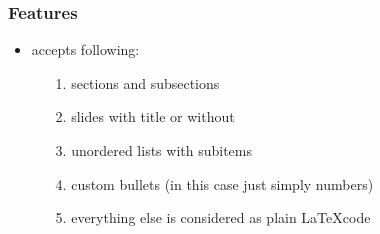 \documentclass{beamer}
\begin{document}
\begin{frame}	%
\frametitle{Features}
\begin{itemize}
	\item accepts following:
	\begin{itemize}
		\item[1.] sections and subsections
		\item[2.] slides with title or without
		\item[3.] unordered lists with subitems
		\item[4.] custom bullets (in this case just simply numbers)
		\item[5.] everything else is considered as plain \LaTeX code
	\end{itemize}
\end{itemize}
\end{frame}
\end{document}
